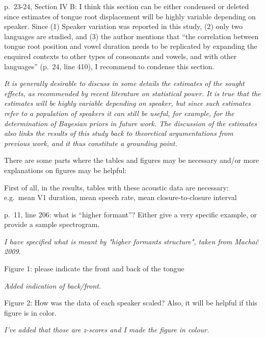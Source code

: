 \documentclass[]{article}
\begin{document}
p.~23-24, Section IV B: I think this section can be either condensed or
deleted since estimates of tongue root displacement will be highly
variable depending on speaker. Since (1) Speaker variation was reported
in this study, (2) only two languages are studied, and (3) the author
mentions that ``the correlation between tongue root position and vowel
duration needs to be replicated by expanding the enquired contexts to
other types of consonants and vowels, and with other languages'' (p.~24,
line 410), I recommend to condense this section.

\begin{adjustwidth}{1cm}{} \textit{
It is generally desirable to discuss in some details the estimates of the sought effects, as recommended by recent literature on statistical power. It is true that the estimates will be highly variable depending on speaker, but since such estimates refer to a population of speakers it can still be useful, for example, for the determination of Bayesian priors in future work. The discussion of the estimates also links the results of this study back to theoretical argumentations from previous work, and it thus constitute a grounding point.
} \end{adjustwidth}

There are some parts where the tables and figures may be necessary
and/or more explanations on figures may be helpful:

First of all, in the results, tables with these acoustic data are
necessary: e.g.~mean V1 duration, mean speech rate, mean
closure-to-closure interval

p.~11, line 206: what is ``higher formant''? Either give a very specific
example, or provide a sample spectrogram.

\begin{adjustwidth}{1cm}{} \textit{
I have specified what is meant by "higher formants structure", taken from Machač 2009.
} \end{adjustwidth}

Figure 1: please indicate the front and back of the tongue

\begin{adjustwidth}{1cm}{} \textit{
Added indication of back/front.
} \end{adjustwidth}

Figure 2: How was the data of each speaker scaled? Also, it will be
helpful if this figure is in color.

\begin{adjustwidth}{1cm}{} \textit{
I've added that those are z-scores and I made the figure in colour.
} \end{adjustwidth}
\end{document}
